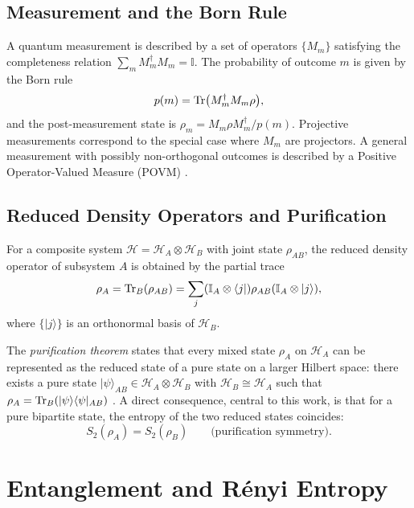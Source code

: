 \documentclass[12pt,a4paper,oneside]{book}
\theoremstyle{plain}
\theoremstyle{definition}
\theoremstyle{remark}
\begin{document}
\subsection{Measurement and the Born Rule}

A quantum measurement is described by a set of operators $\{M_m\}$ satisfying the completeness relation $\sum_m M_m^\dagger M_m = \mathbb{I}$. The probability of outcome $m$ is given by the Born rule
\begin{equation}
    p(m) = \Tr\bigl(M_m^\dagger M_m \rho\bigr),
\end{equation}
and the post-measurement state is $\rho_m = M_m \rho M_m^\dagger / p(m)$. Projective measurements correspond to the special case where $M_m$ are projectors. A general measurement with possibly non-orthogonal outcomes is described by a Positive Operator-Valued Measure (POVM) \cite{nielsen2010quantum}.

\subsection{Reduced Density Operators and Purification}

For a composite system $\mathcal{H} = \mathcal{H}_A \otimes \mathcal{H}_B$ with joint state $\rho_{AB}$, the reduced density operator of subsystem $A$ is obtained by the partial trace
\begin{equation}
    \rho_A = \Tr_B(\rho_{AB}) = \sum_j (\mathbb{I}_A \otimes \langle j|) \rho_{AB} (\mathbb{I}_A \otimes |j\rangle),
\end{equation}
where $\{|j\rangle\}$ is an orthonormal basis of $\mathcal{H}_B$.

The \emph{purification theorem} states that every mixed state $\rho_A$ on $\mathcal{H}_A$ can be represented as the reduced state of a pure state on a larger Hilbert space: there exists a pure state $|\psi\rangle_{AB} \in \mathcal{H}_A \otimes \mathcal{H}_B$ with $\mathcal{H}_B \cong \mathcal{H}_A$ such that $\rho_A = \Tr_B(|\psi\rangle\langle\psi|_{AB})$ \cite{nielsen2010quantum}. A direct consequence, central to this work, is that for a pure bipartite state, the entropy of the two reduced states coincides:
\begin{equation}
    S_2(\rho_A) = S_2(\rho_B) \qquad \text{(purification symmetry).}
\end{equation}

\section{Entanglement and R\'enyi Entropy}
\label{sec:renyi}
\end{document}
